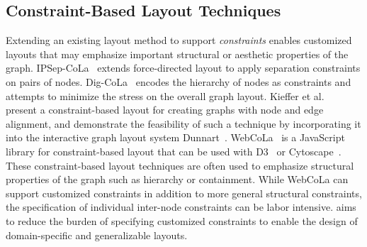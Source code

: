 
\subsection{Constraint-Based Layout Techniques}
Extending an existing layout method to support \emph{constraints} enables customized layouts that may emphasize important
structural or aesthetic properties of the graph. IPSep-CoLa~ extends
force-directed layout to apply separation constraints on pairs of nodes.
Dig-CoLa~\cite{dwyer2005dig} encodes the hierarchy of nodes as constraints
and attempts to minimize the stress on the overall graph layout. 
Kieffer et al.~\cite{kieffer2013incremental} present a constraint-based 
layout for creating graphs with node and edge alignment,
and demonstrate the feasibility of such a technique by incorporating it into
the interactive graph layout system Dunnart~\cite{dwyer2008dunnart}.
WebCoLa~\cite{WebCoLa} is a JavaScript library for constraint-based layout 
that can be used with D3~\cite{bostock:d3} or Cytoscape~\cite{shannon2003cytoscape}. 
These constraint-based layout techniques are often used to emphasize structural properties of
the graph such as hierarchy or containment. While WebCoLa can support 
customized constraints in addition to more general structural constraints,
the specification of individual inter-node constraints can be labor intensive.
\projectname aims to reduce the burden of specifying customized constraints
to enable the design of domain-specific and generalizable layouts.



